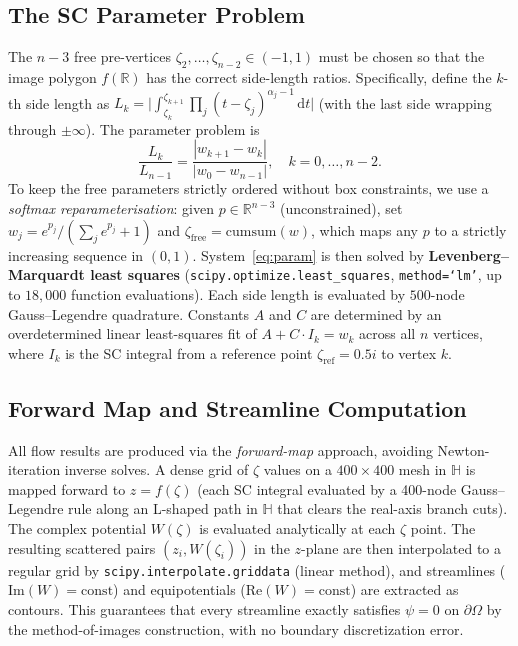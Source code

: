 \documentclass[11pt]{article}
\newcommand{\HH}{\mathbb{H}}          %
\newcommand{\RR}{\mathbb{R}}
\newcommand{\dif}{\,\mathrm{d}}
\newcommand{\Imag}{\mathrm{Im}}
\newcommand{\Real}{\mathrm{Re}}
\begin{document}
\subsection{The SC Parameter Problem}

The $n-3$ free pre-vertices $\zeta_2,\dots,\zeta_{n-2}\in(-1,1)$ must be
chosen so that the image polygon $f(\RR)$ has the correct side-length ratios.
Specifically, define the $k$-th side length as
$L_k = \bigl|\int_{\zeta_k}^{\zeta_{k+1}}\prod_j(t-\zeta_j)^{\alpha_j-1}\dif t\bigr|$
(with the last side wrapping through $\pm\infty$). The parameter problem is
\begin{equation}
  \frac{L_k}{L_{n-1}} = \frac{|w_{k+1}-w_k|}{|w_0-w_{n-1}|},
  \quad k=0,\dots,n-2.
  \label{eq:param}
\end{equation}
To keep the free parameters strictly ordered without box constraints, we use a
\emph{softmax reparameterisation}: given $p\in\RR^{n-3}$ (unconstrained), set
$w_j = e^{p_j}/(\sum_j e^{p_j}+1)$ and $\zeta_{\mathrm{free}}=\mathrm{cumsum}(w)$,
which maps any $p$ to a strictly increasing sequence in $(0,1)$. System~\eqref{eq:param}
is then solved by \textbf{Levenberg--Marquardt least squares}
(\texttt{scipy.optimize.least\_squares}, \texttt{method=`lm'},
up to $18{,}000$ function evaluations). Each side length is evaluated by
$500$-node Gauss--Legendre quadrature. Constants $A$ and $C$ are determined
by an overdetermined linear least-squares fit of $A+C\cdot I_k = w_k$ across
all $n$ vertices, where $I_k$ is the SC integral from a reference
point $\zeta_{\mathrm{ref}}=0.5i$ to vertex $k$.

\subsection{Forward Map and Streamline Computation}

All flow results are produced via the \emph{forward-map} approach, avoiding
Newton-iteration inverse solves. A dense grid of $\zeta$ values on a
$400\times400$ mesh in $\HH$ is mapped forward to $z=f(\zeta)$ (each SC
integral evaluated by a 400-node Gauss--Legendre rule along an L-shaped path
in $\HH$ that clears the real-axis branch cuts). The complex potential $W(\zeta)$
is evaluated analytically at each $\zeta$ point. The resulting scattered pairs
$(z_i, W(\zeta_i))$ in the $z$-plane are then interpolated to a regular grid by
\texttt{scipy.interpolate.griddata} (linear method), and streamlines
($\Imag(W)=\mathrm{const}$) and equipotentials ($\Real(W)=\mathrm{const}$)
are extracted as contours. This guarantees that every streamline exactly satisfies
$\psi=0$ on $\partial\Omega$ by the method-of-images construction, with no
boundary discretization error.
\end{document}
